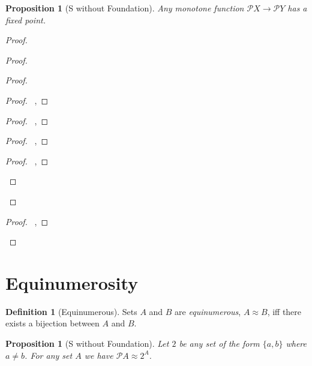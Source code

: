 \documentclass{book}
\let\qed\relax
\newtheorem{prop}[ax]{Proposition}
\theoremstyle{definition}
\newtheorem{df}[ax]{Definition}
\begin{document}
\begin{prop}[S without Foundation]
\label{prop:monotone_fixed_point}
Any monotone function $\mathcal{P} X \rightarrow \mathcal{P} Y$ has a fixed point.
\end{prop}

\begin{proof}
\pf
{}
\begin{proof}
	\begin{proof}
		\begin{proof}
			\pf\ , 
		\end{proof}
		\begin{proof}
			\pf\ , 
		\end{proof}
		\begin{proof}
			\pf\ , 
		\end{proof}
		\begin{proof}
			\pf\ , 
		\end{proof}
	\end{proof}
\end{proof}
\begin{proof}
	\pf\ , 
\end{proof}
\qed
\end{proof}

\section{Equinumerosity}

\begin{df}[Equinumerous]
Sets $A$ and $B$ are \emph{equinumerous}, $A \approx B$, iff there exists a bijection between $A$ and $B$.
\end{df}

\begin{prop}[S without Foundation]
Let $2$ be any set of the form $\{a,b\}$ where $a \neq b$.
For any set $A$ we have $\mathcal{P} A \approx 2^A$.
\end{prop}
\end{document}
